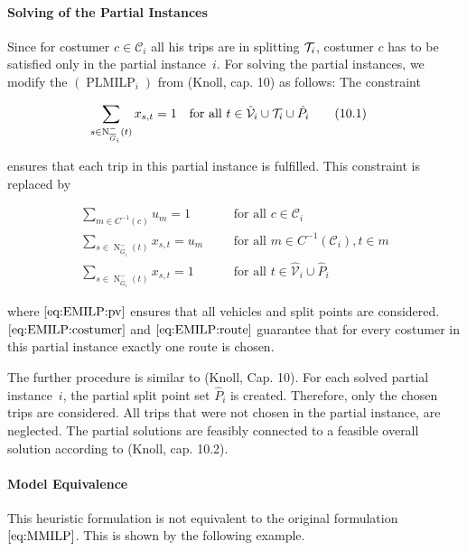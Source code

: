 \paragraph{Solving of the Partial Instances} \parfill

Since for costumer $c\in\mathcal{C}_i$ all his trips are in splitting $\mathcal{T}_i$, costumer $c$ has to be satisfied only in the partial instance~$i$. For solving the partial instances, we modify the $(\operatorname{PLMILP}_i)$ from (Knoll, cap. 10) as follows: The constraint 

\begin{align}
	\sum_{s\in\operatorname{N}_{\overline{G}_i}^-(t)} x_{s,t} = 1 &&& \text{for all } t\in\hat{\mathcal{V}}_i\cup\mathcal{T}_i\cup\hat{P}_i \tag{10.1}
\end{align}

ensures that each trip in this partial instance is fulfilled. This constraint is replaced by

\begin{align}
	\sum_{m\in C^{-1}(c)} u_m = 1 &&& \text{for all } c\in\mathcal{C}_i \label{eq:EMILP:costumer} \\
	\sum_{s\in\operatorname{N}_{\overline{G}_i}^-(t)} x_{s,t} = u_m &&& \text{for all } m\in C^{-1}\left(\mathcal{C}_i\right), t\in m \label{eq:EMILP:route} \\
	\sum_{s\in\operatorname{N}_{\overline{G}_i}^-(t)} x_{s,t} = 1 &&& \text{for all } t\in\hat{\mathcal{V}}_i\cup\hat{P}_i \label{eq:EMILP:pv}
\end{align}

where $\eqref{eq:EMILP:pv}$ ensures that all vehicles and split points are considered. $\eqref{eq:EMILP:costumer}$ and $\eqref{eq:EMILP:route}$ guarantee that for every costumer in this partial instance exactly one route is chosen.

The further procedure is similar to (Knoll, Cap. 10). For each solved partial instance~$i$, the partial split point set $\hat{P}_i$ is created. Therefore, only the chosen trips are considered. All trips that were not chosen in the partial instance, are neglected. The partial solutions are feasibly connected to a feasible overall solution according to (Knoll, cap. 10.2).

\paragraph{Model Equivalence}

This heuristic formulation is not equivalent to the original formulation $\eqref{eq:MMILP}$. This is shown by the following example.

